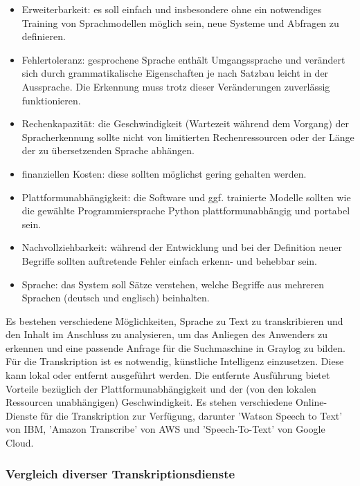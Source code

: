 \begin{itemize}
\item Erweiterbarkeit: es soll einfach und insbesondere ohne ein notwendiges Training von Sprachmodellen möglich sein, neue Systeme und Abfragen zu definieren.
\item Fehlertoleranz: gesprochene Sprache enthält Umgangssprache und verändert sich durch grammatikalische Eigenschaften je nach Satzbau leicht in der Aussprache. Die Erkennung muss trotz dieser Veränderungen zuverlässig funktionieren.
\item Rechenkapazität: die Geschwindigkeit (Wartezeit während dem Vorgang) der Spracherkennung sollte nicht von limitierten Rechenressourcen oder der Länge der zu übersetzenden Sprache abhängen.
\item finanziellen Kosten: diese sollten möglichst gering gehalten werden.
\item Plattformunabhängigkeit: die Software und ggf. trainierte Modelle sollten wie die gewählte Programmiersprache Python plattformunabhängig und portabel sein.
\item Nachvollziehbarkeit: während der Entwicklung und bei der Definition neuer Begriffe sollten auftretende Fehler einfach erkenn- und behebbar sein.
\item Sprache: das System soll Sätze verstehen, welche Begriffe aus mehreren Sprachen (deutsch und englisch) beinhalten.
\end{itemize}

Es bestehen verschiedene Möglichkeiten, Sprache zu Text zu transkribieren und den Inhalt im Anschluss zu analysieren, um das Anliegen des Anwenders zu erkennen und eine passende Anfrage für die Suchmaschine in Graylog zu bilden. Für die Transkription ist es notwendig, künstliche Intelligenz einzusetzen. Diese kann lokal oder entfernt ausgeführt werden. Die entfernte Ausführung bietet Vorteile bezüglich der Plattformunabhängigkeit und der (von den lokalen Ressourcen unabhängigen) Geschwindigkeit. Es stehen verschiedene Online-Dienste für die Transkription zur Verfügung, darunter 'Watson Speech to Text' von IBM, 'Amazon Transcribe' von AWS und 'Speech-To-Text' von Google Cloud. 

\subsubsection{Vergleich diverser Transkriptionsdienste}
\label{sec:vergleich-transkrip}

